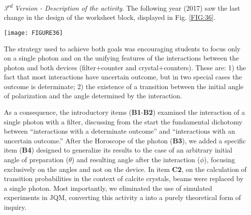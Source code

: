 \documentclass[twocolumn,secnumarabic,amssymb, nobibnotes, aps, prd, nofootinbib]{revtex4-2}
\begin{document}
\emph{3\textsuperscript{rd} Version - Description of the activity}. The following year (2017) saw the last change in the design of the worksheet block, displayed in Fig. \ref{FIG:36}.
\begin{figure*}[!htpb]
       \texttt{[image: FIGURE36]}
    \caption{Worksheet block on the interpretation of Malus's law, including its transfer to the context of calcite crystals: 2017 version.}
    \label{FIG:36}
\end{figure*}
The strategy used to achieve both goals was encouraging students to focus only on a single photon and on the unifying features of the interactions between the photon and both devices (filter$+$counter and crystal$+$counters). These are: 1) the fact that most interactions have uncertain outcome, but in two special cases the outcome is determinate; 2) the existence of a transition between the initial angle of polarization and the angle determined by the interaction.

As a consequence, the introductory items (\textbf{B1}-\textbf{B2}) examined the interaction of a single photon with a filter, discussing from the start the fundamental dichotomy between ``interactions with a determinate outcome'' and ``interactions with an uncertain outcome.'' After the Horoscope of the photon (\textbf{B3}), we added a specific item (\textbf{B4}) designed to generalize its results to the case of an arbitrary initial angle of preparation ($\theta$) and resulting angle after the interaction ($\phi$), focusing exclusively on the angles and not on the device. In item \textbf{C2}, on the calculation of transition probabilities in the context of calcite crystals, beams were replaced by a single photon. Most importantly, we eliminated the use of simulated experiments in JQM, converting this activity a into a purely theoretical form of inquiry.
\end{document}
